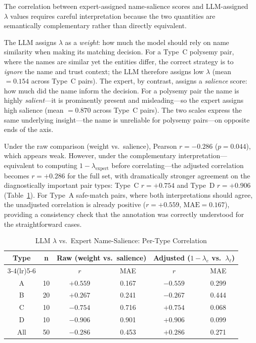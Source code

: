 The correlation between expert-assigned name-salience scores and
LLM-assigned $\lambda$ values requires careful interpretation because
the two quantities are semantically complementary rather than
directly equivalent.

The LLM assigns $\lambda$ as a \emph{weight}: how much the model
should rely on name similarity when making its matching decision.
For a Type~C polysemy pair, where the names are similar yet the
entities differ, the correct strategy is to \emph{ignore} the name
and trust context; the LLM therefore assigns low $\lambda$
(mean $= 0.154$ across Type~C pairs).
The expert, by contrast, assigns a \emph{salience} score: how much
did the name inform the decision. For a polysemy pair the name is
highly \emph{salient}---it is prominently present and misleading---so
the expert assigns high salience (mean $= 0.870$ across Type~C pairs).
The two scales express the same underlying insight---the name is
unreliable for polysemy pairs---on opposite ends of the axis.

Under the raw comparison (weight vs.\ salience), Pearson
$r = -0.286$ ($p = 0.044$), which appears weak. However, under the
complementary interpretation---equivalent to computing
$1 - \lambda_{\text{expert}}$ before correlating---the adjusted
correlation becomes $r = +0.286$ for the full set, with dramatically
stronger agreement on the diagnostically important pair types: Type~C
$r = +0.754$ and Type~D $r = +0.906$ (Table~\ref{tab:lambda_corr}).
For Type~A safe-match pairs, where both interpretations should agree,
the unadjusted correlation is already positive ($r = +0.559$,
$\text{MAE} = 0.167$), providing a consistency check that the
annotation was correctly understood for the straightforward cases.

\begin{table}[h]
\caption{LLM $\lambda$ vs.\ Expert Name-Salience: Per-Type Correlation}
\label{tab:lambda_corr}
\centering
\begin{tabular}{cccccc}
\toprule
\textbf{Type} & \textbf{n} &
  \multicolumn{2}{c}{\textbf{Raw (weight vs.\ salience)}} &
  \multicolumn{2}{c}{\textbf{Adjusted ($1-\lambda_e$ vs.\ $\lambda_{\ell}$)}} \\
\cmidrule(lr){3-4}\cmidrule(lr){5-6}
& & $r$ & MAE & $r$ & MAE \\
\midrule
A & 10 & $+0.559$ & 0.167 & $-0.559$ & 0.299 \\
B & 20 & $+0.267$ & 0.241 & $-0.267$ & 0.444 \\
C & 10 & $-0.754$ & 0.716 & $+0.754$ & 0.068 \\
D & 10 & $-0.906$ & 0.901 & $+0.906$ & 0.099 \\
\midrule
All & 50 & $-0.286$ & 0.453 & $+0.286$ & 0.271 \\
\bottomrule
\end{tabular}
\end{table}

